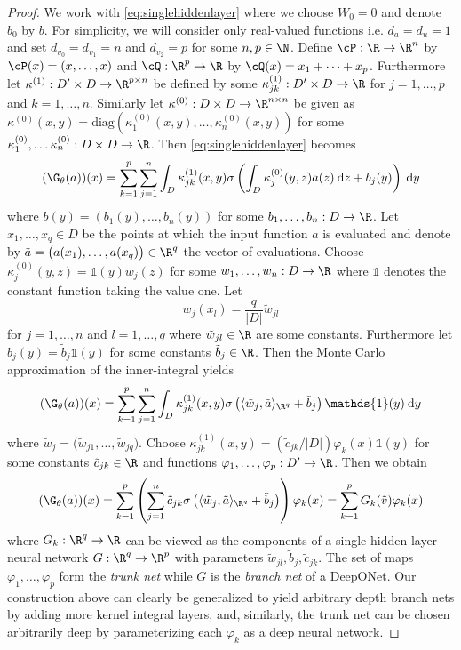 \begin{proof}
We work with \eqref{eq:singlehiddenlayer} where we choose \(W_0 = 0\) and denote \(b_0\) by \(b\). For simplicity, we will consider only real-valued functions i.e. \(d_a = d_u = 1\) and set \(d_{v_0} = d_{v_1} = n \) and \( d_{v_2} = p\)
for some \(n, p \in \N\).
Define \(\cP : \R \to \R^n\) by \(\cP(x) = (x,\dots,x)\) and 
\(\cQ: \R^p \to \R\) by \(\cQ(x) = x_1 + \dots + x_p\). Furthermore let \(\kappa^{(1)}: D' \times D \to \R^{p \times n}\) be defined by some \(\kappa^{(1)}_{jk} : D' \times D \to \R\) for \(j=1,\dots,p\) and \(k=1,\dots,n\). Similarly let 
\(\kappa^{(0)}: D \times D \to \R^{n \times n}\) be given as \(\kappa^{(0)}(x,y) = \text{diag}(\kappa^{(0)}_1(x,y), \dots, \kappa^{(0)}_n(x,y))\) for some \(\kappa^{(0)}_1, \dots \kappa^{(0)}_n : D \times D \to \R\). Then \eqref{eq:singlehiddenlayer} becomes 
\[(\G_\theta (a))(x) = \sum_{k=1}^p \sum_{j=1}^n \int_D \kappa^{(1)}_{jk}(x, y) \sigma \left ( \int_D \kappa^{(0)}_j (y,z) a(z) \: \text{d}z + b_j(y) \right ) \: \text{d}y\]
where \(b(y) = (b_1(y),\dots,b_n(y))\) for some \(b_1,\dots,b_n : D \to \R\). Let \(x_1,\dots,x_q \in D\) be the points at which the input function \(a\) is evaluated and denote by \(\tilde{a} = \big( a(x_1), \dots, a(x_q) \big ) \in \R^q\) the vector of evaluations.
Choose \(\kappa^{(0)}_{j} (y,z) = \mathds{1}(y) w_j(z)\) for some \(w_1,\dots,w_n : D \to \R\) where \(\mathds{1}\) denotes the constant function taking the value one. Let
\[w_j(x_l) = \frac{q}{|D|} \tilde{w}_{jl}\]
for \(j=1,\dots,n\) and \(l=1,\dots,q\) where \(\tilde{w}_{jl} \in \R\) are some constants. Furthermore let \(b_j (y) = \tilde{b}_j \mathds{1}(y)\) for some constants \(\tilde{b}_j \in \R\). Then the Monte Carlo approximation of the inner-integral yields
\[(\G_\theta (a))(x) = \sum_{k=1}^p \sum_{j=1}^n \int_D \kappa^{(1)}_{jk}(x, y) \sigma \left ( \langle \tilde{w}_j, \tilde{a} \rangle_{\R^q} + \tilde{b}_j \right ) \mathds{1}(y) \: \text{d}y\]
where \(\tilde{w}_j = \big ( \tilde{w}_{j1}, \dots, \tilde{w}_{jq} \big ) \). Choose \(\kappa^{(1)}_{jk}(x,y) = (\tilde{c}_{jk} / |D|) \varphi_k (x) \mathds{1}(y)\) for some constants \(\tilde{c}_{jk} \in \R\) and functions \(\varphi_1, \dots, \varphi_p : D' \to \R\). Then we obtain
\begin{equation}
\label{eq:likedeeponet}
(\G_\theta (a))(x) = \sum_{k=1}^p \left ( \sum_{j=1}^n \tilde{c}_{jk} \sigma \left ( \langle \tilde{w}_j, \tilde{a} \rangle_{\R^q} + \tilde{b}_j \right ) \right ) \varphi_k(x) = \sum_{k=1}^p G_k(\tilde{v}) \varphi_k (x)
\end{equation}
where \(G_k : \R^q \to \R\) can be viewed as the components of a single hidden layer neural network \(G : \R^q \to \R^p\) with parameters \(\tilde{w}_{jl}, \tilde{b}_j, \tilde{c}_{jk}\). The set of maps \(\varphi_1,\dots,\varphi_p\) form the \textit{trunk net} while \(G\) is the \textit{branch net} of a DeepONet. Our construction above can clearly be generalized to yield arbitrary depth branch nets by adding more kernel integral layers, and, similarly, the trunk net can be chosen arbitrarily deep by parameterizing each \(\varphi_k\) as a deep neural network. 
\end{proof}

